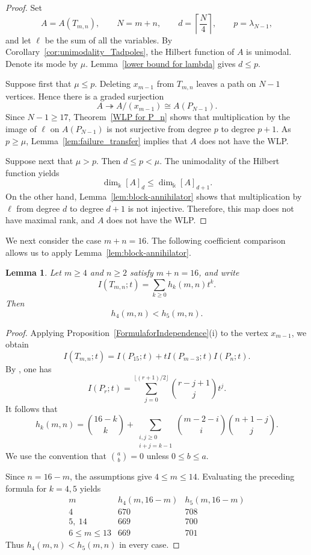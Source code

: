 \documentclass[12pt,twoside]{amsart}
\newtheorem{lemma}[thm]{Lemma}
\theoremstyle{definition}
\theoremstyle{mystyle}
\begin{document}
\begin{proof}
	Set
	\[
	A=A(T_{m,n}),\qquad
	N=m+n,\qquad
	d=\left\lceil\frac{N}{4}\right\rceil,
	\qquad
	p=\lambda_{N-1},
	\]
	and let $\ell$ be the sum of all the variables.
	By Corollary~\ref{cor:unimodality_Tadpoles}, the Hilbert
	function of $A$ is unimodal. Denote its mode by $\mu$.
	Lemma~\ref{lower bound for lambda} gives $d\leq p$.
	
	Suppose first that $\mu\leq p$. Deleting $x_{m-1}$ from
	$T_{m,n}$ leaves a path on $N-1$ vertices. Hence there is
	a graded surjection
	\[
	A\twoheadrightarrow A/(x_{m-1})\cong A(P_{N-1}).
	\]
	Since $N-1\geq17$, Theorem~\ref{WLP for P_n} shows that
	multiplication by the image of $\ell$ on $A(P_{N-1})$
	is not surjective from degree $p$ to degree $p+1$.
	As $p\geq\mu$, Lemma~\ref{lem:failure_transfer} implies
	that $A$ does not have the WLP.
	
	Suppose next that $\mu>p$. Then $d\leq p<\mu.$
	The unimodality of the Hilbert function yields
	\[
	\dim_{\Bbbk}[A]_d\leq\dim_{\Bbbk}[A]_{d+1}.
	\]
	On the other hand, Lemma~\ref{lem:block-annihilator}
	shows that multiplication by $\ell$ from degree $d$
	to degree $d+1$ is not injective. Therefore, this map
	does not have maximal rank, and $A$ does not have
	the WLP.
\end{proof}


We next consider the case $m+n=16$. The following
coefficient comparison allows us to apply
Lemma~\ref{lem:block-annihilator}.

\begin{lemma}\label{lem:finite-mode-comparison}
	Let $m\geq4$ and $n\geq2$ satisfy $m+n=16$, and write
	\[
	I(T_{m,n};t)=\sum_{k\geq0}h_k(m,n)t^k.
	\]
	Then
	\[
	h_4(m,n)<h_5(m,n).
	\]
\end{lemma}

\begin{proof}
Applying Proposition~\ref{FormulaforIndependence}(i) to the vertex $x_{m-1}$, we obtain
	\[
	I(T_{m,n};t)
	=
	I(P_{15};t)+tI(P_{m-3};t)I(P_n;t).
	\]
By \cite[Proposition~3.1]{NT24b}, one has
	\[
	I(P_r;t)
	=
	\sum_{j=0}^{\lfloor(r+1)/2\rfloor}
	\binom{r-j+1}{j}t^j.
	\]
It follows that
	\[
	h_k(m,n)
	=
	\binom{16-k}{k}
	+
	\sum_{\substack{i,j\geq0\\i+j=k-1}}
	\binom{m-2-i}{i}\binom{n+1-j}{j}.
	\]
We use the convention that $\binom{a}{b}=0$
unless $0\leq b\leq a$.
	
	Since $n=16-m$, the assumptions give $4\leq m\leq14$.
	Evaluating the preceding formula for $k=4,5$ yields
	\[
	\begin{array}{c|c|c}
		m & h_4(m,16-m) & h_5(m,16-m)\\
		\hline
		4 & 670 & 708\\
		5,\ 14 & 669 & 700\\
		6\leq m\leq13 & 669 & 701
	\end{array}
	\]
	Thus $h_4(m,n)<h_5(m,n)$ in every case.
\end{proof}
\end{document}
